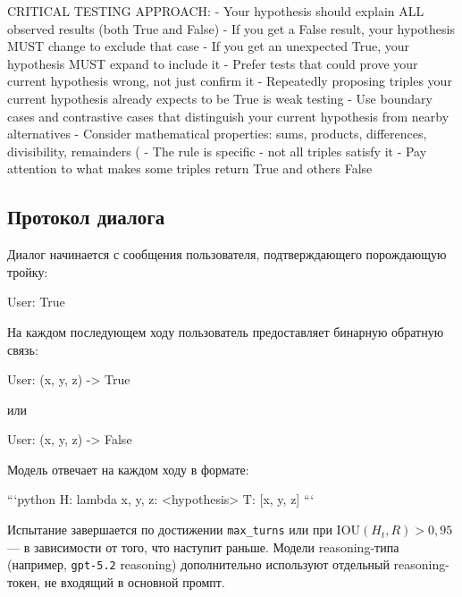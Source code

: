 \begin{prompt}

CRITICAL TESTING APPROACH:
- Your hypothesis should explain ALL observed results (both True and False)
- If you get a False result, your hypothesis MUST change to exclude that case
- If you get an unexpected True, your hypothesis MUST expand to include it
- Prefer tests that could prove your current hypothesis wrong, not just confirm it
- Repeatedly proposing triples your current hypothesis already expects to be True is weak testing
- Use boundary cases and contrastive cases that distinguish your current hypothesis from nearby alternatives
- Consider mathematical properties: sums, products, differences, divisibility, remainders (%
- The rule is specific - not all triples satisfy it
- Pay attention to what makes some triples return True and others False
\end{prompt}

\subsection{Протокол диалога}

Диалог начинается с сообщения пользователя, подтверждающего порождающую тройку:

\begin{prompt}
User: True
\end{prompt}

На каждом последующем ходу пользователь предоставляет бинарную обратную связь:

\begin{prompt}
User: (x, y, z) -> True
\end{prompt}

или

\begin{prompt}
User: (x, y, z) -> False
\end{prompt}

Модель отвечает на каждом ходу в формате:

\begin{prompt}
```python
H: lambda x, y, z: <hypothesis>
T: [x, y, z]
```
\end{prompt}

Испытание завершается по достижении \texttt{max\_turns} или при $\text{IOU}(H_t, R) > 0{,}95$ --- в зависимости от того, что наступит раньше. Модели reasoning-типа (например, \texttt{gpt-5.2} reasoning) дополнительно используют отдельный reasoning-токен, не входящий в основной промпт.
